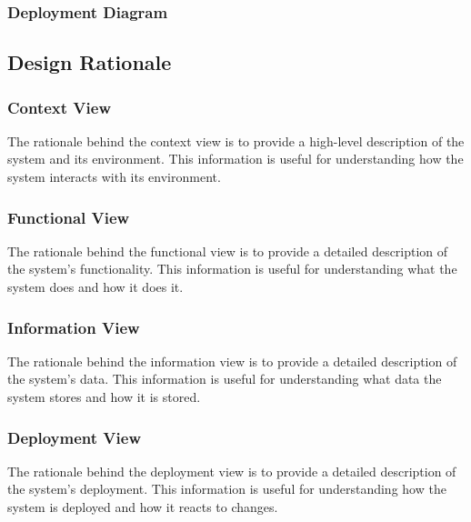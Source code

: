 \documentclass[a4paper]{article}
\begin{document}
    \subsubsection{Deployment Diagram}
    \subsection{Design Rationale}
    \subsubsection{Context View}
    The rationale behind the context view is to provide a high-level description of the system and its environment. This
    information is useful for understanding how the system interacts with its environment.

    \subsubsection{Functional View}
    The rationale behind the functional view is to provide a detailed description of the system's functionality. This information
    is useful for understanding what the system does and how it does it.

    \subsubsection{Information View}
    The rationale behind the information view is to provide a detailed description of the system's data. This information is
    useful for understanding what data the system stores and how it is stored.

    \subsubsection{Deployment View}
    The rationale behind the deployment view is to provide a detailed description of the system's deployment. This information is
    useful for understanding how the system is deployed and how it reacts to changes.
\end{document}
